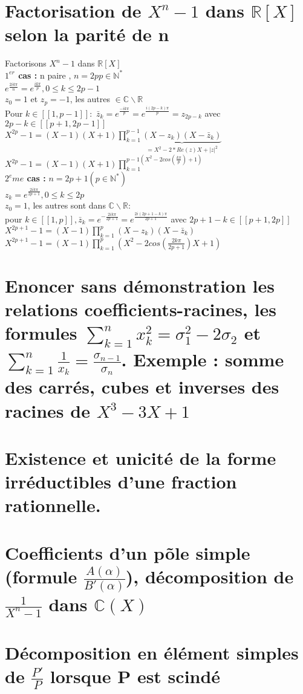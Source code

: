 \documentclass{article}
\begin{document}
\section{Factorisation de $X^n-1$ dans $\mathbb R [X]$ selon la parité de n}
Factorisons $X^n-1$ dans $\mathbb R [X]$ \\
{\bf $1^{er}$ cas :} n paire , $n=2p p \in \mathbb N^*$ \\
$e^{\frac{2ik\pi}{n}}=e^{\frac{ik\pi}{p}}, 0 \leq k \leq 2p-1$ \\
$z_0=1$ et $z_p=-1$, les autres $\in \mathbb C \backslash \mathbb R$ \\
Pour $k \in [[1,p-1]]:$ $\bar{z}_k=e^{\frac{-ik\pi}{p}}=e^{\frac{i(2p-k)\pi}{p}}=z_{2p-k}$ avec $2p-k \in [[p+1,2p-1]]$ \\
$X^{2p}-1=(X-1)(X+1)\prod_{k=1}^{p-1}\underbrace{(X-z_k)(X-\bar{z}_k)}_{=X^2-2*Re(z)X+|z|^2}$ \\
$X^{2p}-1=(X-1)(X+1) \prod_{k=1}^{p-1(X^2-2cos(\frac{k\pi}{p})+1)}$ \\
{\bf $2^eme$ cas :} $n=2p+1 (p \in \mathbb N^*)$ \\
$z_k=e^{\frac{2ik\pi}{2p+1}},0 \leq k \leq 2p $ \\
$z_0=1$, les autres sont dans $\mathbb C \backslash \mathbb R$: \\
pour $k \in [[1,p]], \bar{z}_k=e^{-\frac{2ik\pi}{2p+1}}=e^{\frac{2i(2p+1-k)\pi}{2p+1}}$ avec $2p+1-k \in [[p+1,2p]]$ \\
$X^{2p+1}-1=(X-1) \prod_{k=1}^p (X-z_k)(X-\bar{z}_k)$ \\
$X^{2p+1}-1=(X-1) \prod_{k=1}^p (X^2-2cos(\frac{2k\pi}{2p+1})X+1)$
\section{Enoncer sans démonstration les relations coefficients-racines, les formules $\sum_{k=1}^n x_k^2= \sigma_1^2-2 \sigma_2$ et $\sum_{k=1}^n \frac{1}{x_k}=\frac{\sigma_{n-1}}{\sigma_{n}}$. Exemple : somme des carrés, cubes et inverses des racines de $X^3-3X+1$}
\section{Existence et unicité de la forme irréductibles d'une fraction rationnelle.}
\section{Coefficients d'un põle simple (formule $\frac{A(\alpha)}{B'(\alpha)}$), décomposition de $\frac{1}{X^n-1}$ dans $\mathbb{C}(X)$}
\section{Décomposition en élément simples de $\frac{P'}{P}$ lorsque P est scindé}
\end{document}
